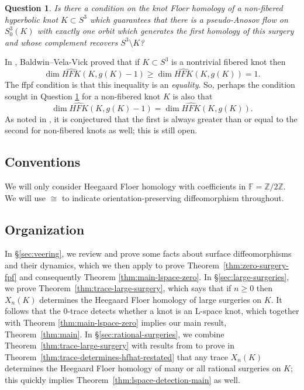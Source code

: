 \documentclass[11pt]{amsart}
\newtheorem {question}[theorem]{Question}
\numberwithin{equation}{section}
\numberwithin{theorem}{section}
\theoremstyle{definition}
\newcommand{\Z}{\mathbb{Z}}
\newcommand{\F}{\mathbb{F}}
\newcommand\hfk{\mathit{HFK}}
\newcommand\hfkhat{\widehat{\hfk}}
\begin{document}
\begin{question}
\label{ques:nonfibered}
Is there a condition on the knot Floer homology of a non-fibered hyperbolic knot $K\subset S^3$ which guarantees that there is  a pseudo-Anosov flow on $S^3_0(K)$ with exactly one orbit which generates the first homology of this surgery and whose complement recovers $S^3\setminus K$?
\end{question}

In \cite{baldwin-velavick}, Baldwin--Vela-Vick proved that if $K\subset S^3$ is a nontrivial fibered knot then \[\dim \hfkhat(K,g(K)-1) \geq \dim \hfkhat(K,g(K)) = 1.\] The ffpf condition is that this inequality is an \emph{equality}. So, perhaps the condition sought in Question \ref{ques:nonfibered} for a non-fibered knot $K$ is also that \[\dim \hfkhat(K,g(K)-1) = \dim \hfkhat(K,g(K)).\]
As noted in \cite{baldwin-velavick}, it is conjectured that the first is always greater than or equal to the second for non-fibered knots as well; this is still open.






\subsection{Conventions} We will only consider Heegaard Floer homology with coefficients in $\F = \Z/2\Z$. We will use $\cong$ to indicate orientation-preserving diffeomorphism throughout.

\subsection{Organization}  In \S\ref{sec:veering}, we review and prove some facts about surface diffeomorphisms and their dynamics, which we then  apply to prove Theorem~\ref{thm:zero-surgery-fpf} and consequently Theorem \ref{thm:main-lspace-zero}. In \S\ref{sec:large-surgeries}, we prove Theorem~\ref{thm:trace-large-surgery}, which says that if $n\geq 0$  then $X_n(K)$ determines the Heegaard Floer homology of large surgeries on $K$. It follows that the $0$-trace detects whether a  knot is an L-space knot, which together with Theorem \ref{thm:main-lspace-zero} implies our main result, Theorem~\ref{thm:main}. In \S\ref{sec:rational-surgeries}, we combine Theorem~\ref{thm:trace-large-surgery} with results from \cite{hayden-mark-piccirillo} to prove in Theorem~\ref{thm:trace-determines-hfhat-restated} that any trace $X_n(K)$  determines the Heegaard Floer homology of many or all rational surgeries on $K$; this quickly implies Theorem~\ref{thm:lspace-detection-main} as well.
\end{document}
